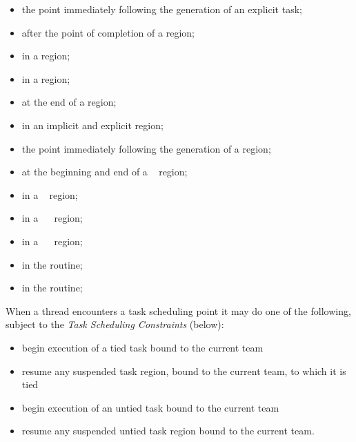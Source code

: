 \begin{itemize}
\item the point immediately following the generation of an explicit task;

\item after the point of completion of a  region;

\item in a  region;

\item in a  region;

\item at the end of a  region;

\item in an implicit and explicit  region;

\item the point immediately following the generation of a  region;

\item at the beginning and end of a ~ region;

\item in a ~ region; 

\item in a ~~ region; 

\item in a ~~ region; 

\item in the  routine; 

\item in the  routine;

\end{itemize}

When a thread encounters a task scheduling point it may do one of the following, 
subject to the \emph{Task Scheduling Constraints} (below):

\begin{itemize}
\item begin execution of a tied task bound to the current team

\item resume any suspended task region, bound to the current team, to which it is tied

\item begin execution of an untied task bound to the current team

\item resume any suspended untied task region bound to the current team.
\end{itemize}

